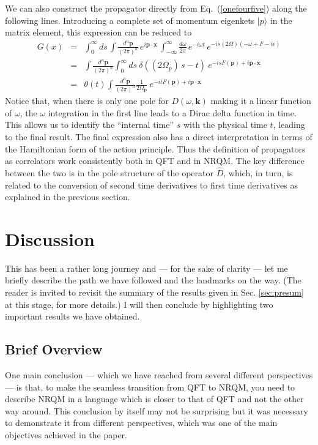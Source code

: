 \documentclass[12pt]{article}
\def\eq#1{{Eq.~(\ref{#1})}}
\def\ket#1{|#1\rangle}                    %
\begin{document}
We can also construct the propagator directly from \eq{onefourfive} along the following lines. Introducing a complete set of momentum eigenkets $\ket{p}$ in the matrix element, this expression can be reduced to
\begin{eqnarray}
 G(x) &=& \int_0^\infty ds \, \int \frac{d^n\bm{p}}{(2\pi)^{n}} \, e^{i\bm{p\cdot x}}\, \int_{-\infty}^\infty \frac{d\omega}{2\pi} \, e^{-i\omega t}\, e^{-is(2\Omega) (-\omega + F - i\epsilon)}\\
 &=& \int \frac{d^n\bm{p}}{(2\pi)^{n}} \int_0^\infty ds\ \delta\left((2\Omega_p)\,s - t\right) \ e^{-isF(\bm{p}) + i \bm{p\cdot x}} \\
 &=&\theta(t)  \int \frac{d^n\bm{p}}{(2\pi)^{n}}\frac{1}{2\Omega_{\bm{p}}} \ e^{-it F(\bm{p}) +i \bm{p\cdot x}}
\end{eqnarray} 
Notice that, when there is only one pole for $D(\omega, \bm{k})$ making it a linear function of $\omega$, the $\omega$ integration in the first line leads to a Dirac delta function in time. This allows us to identify the ``internal time'' $s $ with the physical time $t$, leading to the final result. The final expression also has a direct interpretation in terms of the Hamiltonian form of the action principle. Thus the definition of propagators as correlators work consistently both in QFT and in NRQM. The key difference between the two is in the pole structure of the operator $\hat D$, which, in turn, is related to the conversion of second time derivatives to first time derivatives as explained in the previous section. 


\section{Discussion}
\label{sec:impli}

This has been a rather long journey and --- for the sake of clarity --- let me briefly describe the path we have followed and the landmarks on the way. (The reader is invited to revisit the summary of the results given in Sec. \ref{sec:presum} at this stage, for more details.) I will then conclude by highlighting two important results we have obtained.

\subsection{Brief Overview}

One main conclusion --- which we have reached from several different perspectives --- is that, to make the seamless transition from QFT to NRQM, you need to describe NRQM in a language
which is closer to that of QFT and  not the other way around. This conclusion by itself may not be surprising but it was necessary to demonstrate it from different perspectives, which was one of the main objectives achieved in the paper. 
\end{document}
